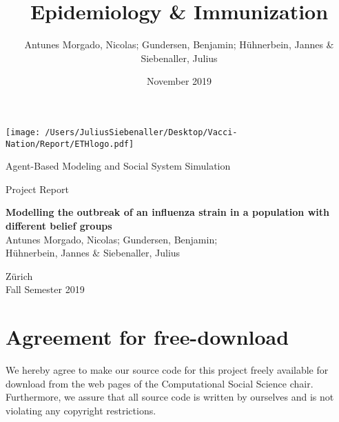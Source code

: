 \documentclass[11pt]{article}
\title{Epidemiology \& Immunization}
\author{Antunes Morgado, Nicolas; Gundersen, Benjamin; H{\"u}hnerbein, Jannes & Siebenaller, Julius}
\date{November 2019}
\begin{document}

\thispagestyle{empty}

\begin{center}
\texttt{[image: /Users/JuliusSiebenaller/Desktop/Vacci-Nation/Report/ETHlogo.pdf]}

\vspace{1.75\baselineskip}
\LARGE{ Agent-Based Modeling and Social System Simulation\\}

\vspace{0.3\baselineskip}
	
\large{Project Report}\\
\vspace{0.75\baselineskip}

\vfill
\textbf{\LARGE{Modelling the outbreak of an influenza strain in a population with different belief groups}}\\
\vspace{1.5\baselineskip}
\large{Antunes Morgado, Nicolas; Gundersen, Benjamin; \\ H{\"u}hnerbein, Jannes \& Siebenaller, Julius}
\vfill

Z{\"u}rich\\
Fall Semester 2019\\
\vspace{0.5\baselineskip}
\end{center}
\newpage

\newpage
\section*{Agreement for free-download}
\bigskip
\bigskip

\large We hereby agree to make our source code for this project freely available for download from the web pages of the Computational Social Science chair. Furthermore, we assure that all source code is written by ourselves and is not violating any copyright restrictions.
\end{document}
